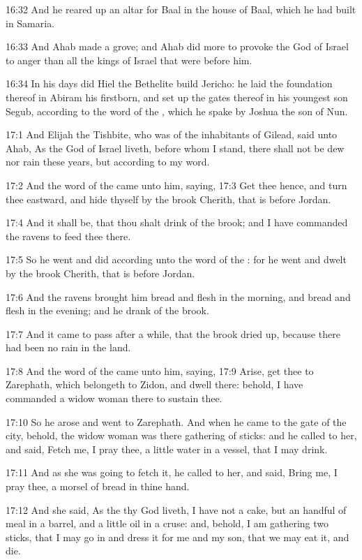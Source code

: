 16:32 And he reared up an altar for Baal in the house of Baal, which
he had built in Samaria.

16:33 And Ahab made a grove; and Ahab did more to provoke the \LORD God
of Israel to anger than all the kings of Israel that were before him.

16:34 In his days did Hiel the Bethelite build Jericho: he laid the
foundation thereof in Abiram his firstborn, and set up the gates
thereof in his youngest son Segub, according to the word of the \LORD,
which he spake by Joshua the son of Nun.

17:1 And Elijah the Tishbite, who was of the inhabitants of Gilead,
said unto Ahab, As the \LORD God of Israel liveth, before whom I stand,
there shall not be dew nor rain these years, but according to my word.

17:2 And the word of the \LORD came unto him, saying, 17:3 Get thee
hence, and turn thee eastward, and hide thyself by the brook Cherith,
that is before Jordan.

17:4 And it shall be, that thou shalt drink of the brook; and I have
commanded the ravens to feed thee there.

17:5 So he went and did according unto the word of the \LORD: for he
went and dwelt by the brook Cherith, that is before Jordan.

17:6 And the ravens brought him bread and flesh in the morning, and
bread and flesh in the evening; and he drank of the brook.

17:7 And it came to pass after a while, that the brook dried up,
because there had been no rain in the land.

17:8 And the word of the \LORD came unto him, saying, 17:9 Arise, get
thee to Zarephath, which belongeth to Zidon, and dwell there: behold,
I have commanded a widow woman there to sustain thee.

17:10 So he arose and went to Zarephath. And when he came to the gate
of the city, behold, the widow woman was there gathering of sticks:
and he called to her, and said, Fetch me, I pray thee, a little water
in a vessel, that I may drink.

17:11 And as she was going to fetch it, he called to her, and said,
Bring me, I pray thee, a morsel of bread in thine hand.

17:12 And she said, As the \LORD thy God liveth, I have not a cake, but
an handful of meal in a barrel, and a little oil in a cruse: and,
behold, I am gathering two sticks, that I may go in and dress it for
me and my son, that we may eat it, and die.

